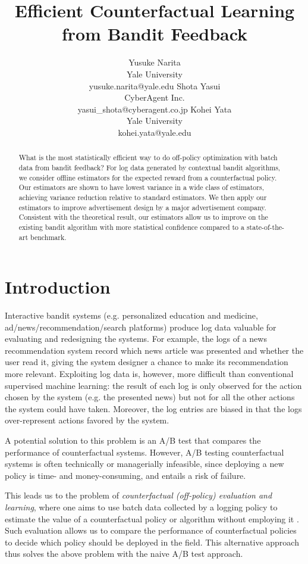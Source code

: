 \documentclass[letterpaper]{article} \usepackage{aaai19}  \usepackage{times}  \usepackage{helvet}  \usepackage{courier}  \usepackage{url}  \usepackage{graphicx}  \frenchspacing  \usepackage{comment}
\title{Efficient Counterfactual Learning from Bandit Feedback}
\author{Yusuke Narita\\ Yale University \\yusuke.narita@yale.edu 
\And Shota Yasui\\ CyberAgent Inc. \\yasui\_shota@cyberagent.co.jp 
\And Kohei Yata\\ Yale University \\kohei.yata@yale.edu
}
\newcommand{\citep}{\cite}
\begin{document}
\maketitle
\begin{abstract}
\noindent What is the most statistically efficient way to do off-policy optimization with batch data from bandit feedback? 
For log data generated by contextual bandit algorithms, we consider offline estimators for the expected reward from a counterfactual policy. 
Our estimators are shown to have lowest variance in a wide class of estimators, achieving variance reduction relative to standard estimators. 
We then apply our estimators to improve advertisement design by a major advertisement company. 
Consistent with the theoretical result, our estimators allow us to improve on the existing bandit algorithm with more statistical confidence compared to a state-of-the-art benchmark.
\end{abstract}
\section{Introduction}

Interactive bandit systems (e.g. personalized education and medicine, ad/news/recommendation/search platforms) produce log data valuable for evaluating and redesigning the systems. 
For example, the logs of a news recommendation system record which news article was presented and whether the user read it, giving the system designer a chance to make its recommendation more relevant. 
Exploiting log data is, however, more difficult than conventional supervised machine learning: 
the result of each log is only observed for the action chosen by the system (e.g. the presented news) but not for all the other actions the system could have taken. 
Moreover, the log entries are biased in that the logs over-represent actions favored by the system. 

A potential solution to this problem is an A/B test that compares the performance of counterfactual systems. 
However, A/B testing counterfactual systems is often technically or managerially infeasible, since deploying a new policy is time- and money-consuming, and entails a risk of failure.

This leads us to the problem of \textit{counterfactual (off-policy) evaluation and learning}, where one aims to use batch data collected by a logging policy to estimate the value of a counterfactual policy or algorithm without employing it \citep{li2010contextual,Strehl2010,li2011unbiased,Li2012,bottou2013counterfactual,Swaminathan2015,Swaminathan2015b,wang2016optimal,swaminathan2017off}. 
Such evaluation allows us to compare the performance of counterfactual policies to decide which policy should be deployed in the field. 
This alternative approach thus solves the above problem with the naive A/B test approach. \\
\end{document}
